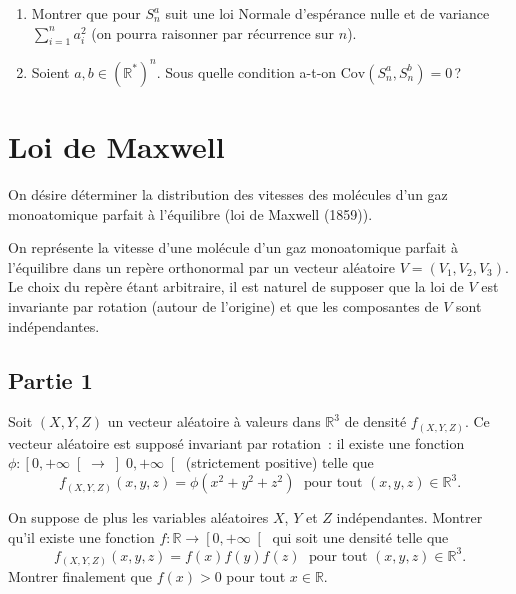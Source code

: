 \begin{enumerate}
\def\labelenumi{\arabic{enumi}.}
\setcounter{enumi}{1}
\item
  Montrer que pour \(S_n^a\) suit une loi Normale d'espérance nulle et
  de variance \(\sum_{i = 1}^n a_i^2\) (on pourra raisonner par
  récurrence sur \(n\)).
\item
  Soient \(a,b\in(\mathbb{R}^{*})^n\). Sous quelle condition a-t-on
  \(\text{Cov}\left(S_n^a, S_n^b\right) = 0\)\,?
\end{enumerate}


\section{Loi de Maxwell}\label{II-loi-de-maxwell}

On désire déterminer la distribution des vitesses des molécules d'un gaz
monoatomique parfait à l'équilibre (loi de Maxwell (1859)).

On représente la vitesse d'une molécule d'un gaz monoatomique parfait à
l'équilibre dans un repère orthonormal par un vecteur aléatoire
\(V = (V_1 , V_2 , V_3 )\). Le choix du repère étant arbitraire, il est
naturel de supposer que la loi de \(V\) est invariante par rotation
(autour de l'origine) et que les composantes de \(V\) sont
indépendantes.

\subsection*{Partie 1}\label{II-partie-1}

Soit \((X, Y, Z)\) un vecteur aléatoire à valeurs dans \(\mathbb{R}^3\)
de densité \(f_{(X, Y, Z)}\). Ce vecteur aléatoire est supposé invariant
par rotation~: il existe une fonction
\(\phi: \left[0, +\infty\right[ \to \left]0, +\infty\right[\)
(strictement positive) telle que \[
f_{(X, Y, Z)}(x,y,z) = \phi(x^2+y^2+z^2) \;  \mbox{ pour tout $(x, y, z) \in \mathbb{R}^3$.}
\]

\label{II-Maxwell-1}
On suppose de plus les variables aléatoires \(X\), \(Y\) et \(Z\)
indépendantes. Montrer qu'il existe une fonction
\(f: \mathbb{R}\to \left[0, +\infty\right[\) qui soit une densité telle
que \[
f_{(X, Y, Z)}(x, y, z) = f(x) f(y) f(z) \; \mbox{ pour tout $(x, y, z) \in \mathbb{R}^3$.} 
\] Montrer finalement que \(f(x) > 0\) pour tout
\(x \in \mathbb{R}\).

